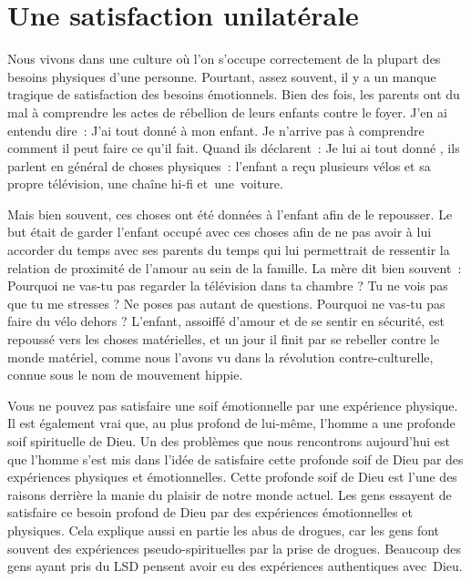 \section{Une satisfaction unilat\'erale}

Nous vivons dans une culture où l'on s'occupe correctement de la plupart
 des besoins physiques d'une personne. Pourtant, assez souvent,
 il y a un manque tragique de satisfaction des besoins émotionnels.
 Bien des fois, les parents ont du mal à comprendre les actes de rébellion
 de leurs enfants contre le foyer. J'en ai entendu dire~:
 \og J'ai tout donné à mon enfant. Je n'arrive pas à comprendre
 comment il peut faire ce qu'il fait. \fg{}
 Quand ils déclarent~: \og Je lui ai tout donné \fg{}, ils parlent en général
 de choses physiques~: l'enfant a reçu plusieurs vélos
 et sa propre télévision, une chaîne hi-fi et~une~voiture.
 \nowidow[6]

Mais bien souvent, ces choses ont été données à l'enfant afin de le repousser.
 Le but était de garder l'enfant occupé avec ces choses afin de ne pas avoir
 à lui accorder du temps avec ses parents
 \ocadr du temps qui lui permettrait de ressentir la relation de proximité
 de l'amour au sein de la famille. La mère dit bien souvent~:
 \og Pourquoi ne vas-tu pas regarder la télévision dans ta chambre ?
 Tu ne vois pas que tu me stresses ? Ne poses pas autant de questions.
 Pourquoi ne vas-tu pas faire du vélo dehors ? \fg{}
 L'enfant, assoiffé d'amour et de se sentir en sécurité,
 est repoussé vers les choses matérielles, et un jour il finit
 par se rebeller contre le monde matériel, comme nous l'avons vu
 dans la révolution contre-culturelle, connue sous le nom de mouvement hippie.


Vous ne pouvez pas satisfaire une soif émotionnelle par une
 expérience physique. Il est également vrai que, au plus profond de lui-même,
 l'homme a une profonde soif spirituelle de Dieu.
 Un des problèmes que nous rencontrons aujourd'hui est que l'homme
 s'est mis dans l'idée de satisfaire cette profonde soif de Dieu
 par des expériences physiques et émotionnelles.
 Cette profonde soif de Dieu est l'une des raisons derrière la manie
 du plaisir de notre monde actuel. Les gens essayent de satisfaire
 ce besoin profond de Dieu par des expériences émotionnelles et physiques.
 Cela explique aussi en partie les abus de drogues,
 car les gens font souvent des expériences pseudo-spirituelles
 par la prise de drogues. Beaucoup des gens ayant pris du LSD
 pensent avoir eu des expériences authentiques avec~Dieu.


